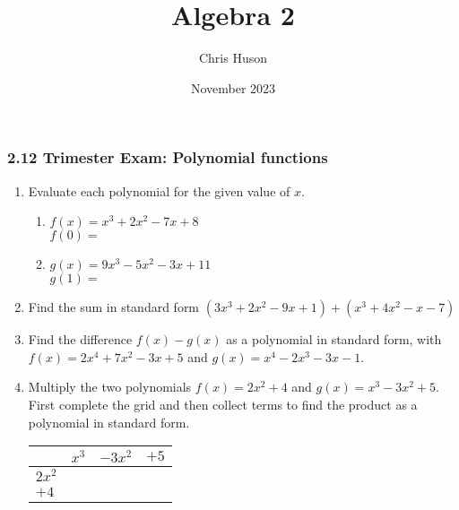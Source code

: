 \documentclass[12pt, twoside]{article}
\title{Algebra 2}
\author{Chris Huson}
\date{November 2023}
\begin{document}
\subsubsection*{2.12 Trimester Exam: Polynomial functions}
\begin{enumerate}

\subsubsection*{A1-A.APR.1 Add, subtract, and multiply polynomials}
\item Evaluate each polynomial for the given value of $x$.
\begin{multicols}{2}
    \begin{enumerate}[itemsep=1cm]
        \item $f(x)=x^3+2x^2-7x+8$\\[0.25cm] 
        $f(0) = $
        \item $g(x)=9x^3-5x^2-3x+11$ \\[0.25cm] 
        $g(1) = $
    \end{enumerate}
    \end{multicols} \vspace{1cm}

\item Find the sum in standard form $(3x^3+2x^2-9x+1)+(x^3+4x^2-x-7)$ \vspace{2.5cm}

\item Find the difference $f(x)-g(x)$ as a polynomial in standard form, with \\[0.25cm]
    $f(x)=2x^4+7x^2-3x+5$ and $g(x)=x^4-2x^3-3x-1$. \vspace{3cm}

\item Multiply the two polynomials $f(x)=2x^2+4$ and $g(x)=x^3-3x^2+5$. First complete the grid and then collect terms to find the product as a polynomial in standard form. \\[0.25cm]
\renewcommand{\arraystretch}{2}
\begin{tabular}{|p{1cm}|p{3cm}|p{3cm}|p{3cm}|}
    \hline
     & $x^3$ & $-3x^2$ & $+5$ \\
    \hline
    $2x^2$ &  & & \\
    \hline
    $+4$ &  & & \\
    \hline
\end{tabular} \vspace{3cm}

\newpage

\end{enumerate}
\end{document}

